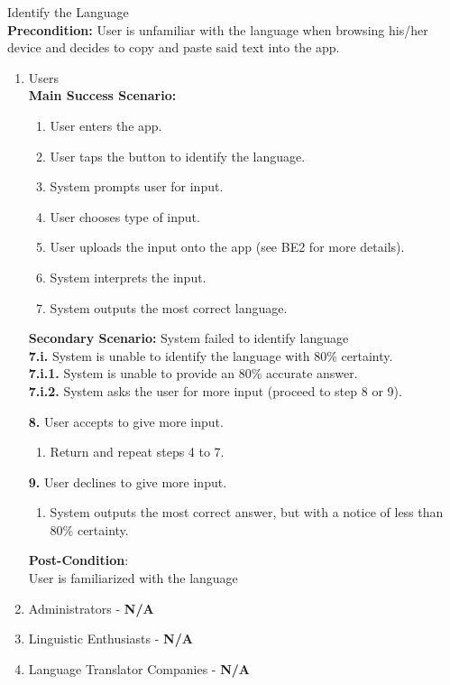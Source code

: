 \item Identify the Language \\
	\textbf{Precondition:} User is unfamiliar with the language when browsing his/her device and decides to copy and paste said text into the app.
	\begin{enumerate}[{\bf VP1:}]
		\item Users \\
				\textbf{Main Success Scenario:}
					\begin{enumerate}[{\bf 1.}]
						\item User enters the app.
						\item User taps the button to identify the language.
							\item System prompts user for input.
							\item User chooses type of input.
							\item User uploads the input onto the app (see BE2 for more details).
							\item System interprets the input.
							\item System outputs the most correct language.
					\end{enumerate}
				
					\textbf{Secondary Scenario:} System failed to identify language \\
					\textbf{7.i.} System is unable to identify the language with 80\% certainty.\\
					\textbf{7.i.1.} System is unable to provide an 80\% accurate answer. \\
					\textbf{7.i.2.} System asks the user for more input (proceed to step 8 or 9).
					
					\textbf{8.} User accepts to give more input.
					\begin{enumerate}[{\bf 8.1.}]
						\item Return and repeat steps 4 to 7.
					\end{enumerate}
					\textbf{9.} User declines to give more input.
					\begin{enumerate}[{\bf 9.1.}]
						\item System outputs the most correct answer, but with a notice of less than 80\% certainty.
					\end{enumerate}
					\textbf{Post-Condition}:
					\\ User is familiarized with the language 
			\item Administrators - \textbf{N/A}
			\item Linguistic Enthusiasts - \textbf{N/A}
			\item Language Translator Companies - \textbf{N/A}
		\end{enumerate}
